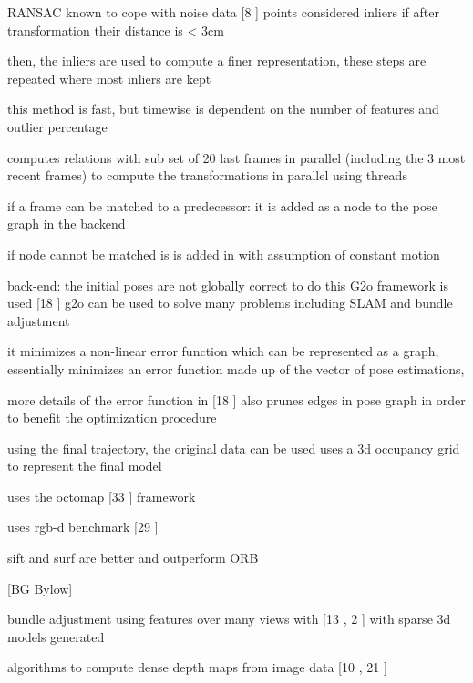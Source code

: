 RANSAC known to cope with noise data [8 \cite{Fischler81Random}]
points considered inliers if after transformation their distance is < 3cm

then, the inliers are used to compute a finer representation, these steps are repeated where most inliers are kept

this method is fast, but timewise is dependent on the number of features and outlier percentage

computes relations with sub set of 20 last frames in parallel (including the 3 most recent frames) to compute the transformations in parallel using threads

if a frame can be matched to a predecessor: it is added as a node to the pose graph in the backend

if node cannot be matched is is added in with assumption of constant motion

back-end:
the initial poses are not globally correct
to do this G2o framework is used [18 \cite{Kummerle11G}]
g2o can be used to solve many problems including SLAM and bundle adjustment

it minimizes a non-linear error function which can be represented as a graph, essentially minimizes an error function made up of the vector of pose estimations, 

more details of the error function in [18 \cite{Kummerle11G}]
also prunes edges in pose graph in order to benefit the optimization procedure

using the final trajectory, the original data can be used 
uses a 3d occupancy grid to represent the final model

uses the octomap [33 \cite{Wurm10Octomap}] framework

uses rgb-d benchmark [29 \cite{Sturm11Towards}]

sift and surf are better and outperform ORB















[BG Bylow]

bundle adjustment using features over many views with [13 \cite{Klein07Parallel} , 2 \cite{Agarwal09Building}] with sparse 3d models generated

algorithms to compute dense depth maps from image data [10 \cite{Hirschmuller05Accurate} , 21 \cite{Stuhmer10Real}]

